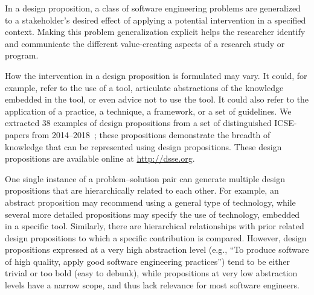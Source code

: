 \documentclass[graybox]{svmult}
\newcommand{\emelie}[1]{\textcolor{red}{{\it [Emelie says: #1]}}}
\newcommand{\peggy}[1]{\textcolor{blue}{{\it [Peggy says: #1]}}}
\newcommand{\per}[1]{\textcolor{cyan}{{\it [Per says: #1]}}}
\newcommand{\emelie}[1]{}
\newcommand{\peggy}[1]{}
\newcommand{\per}[1]{}
\begin{document}
In a design proposition, a class of software engineering problems are generalized to a stakeholder's desired effect of applying a potential intervention in a specified context. 
Making this problem generalization explicit helps the researcher identify and communicate the different value-creating aspects of a research study or program.

How the intervention in a design proposition is formulated may vary. It could, for example, refer to the use of a tool, articulate abstractions of the knowledge embedded in the tool, or even advice not to use the tool.
 It could also refer to the application of a practice, a technique, a framework, or a set of guidelines. We extracted 38 examples of design propositions from a set of distinguished ICSE-papers from 2014--2018~\cite{Engstrom19arxiv}; these propositions demonstrate the breadth of knowledge that can be represented using design propositions. These design propositions are available online at \url{http://dsse.org}.

One single instance of a problem--solution pair can generate multiple design propositions that are hierarchically related to each other. For example, an abstract proposition may recommend using a general type of technology, while several more detailed propositions may specify the use of technology, embedded in a specific tool. Similarly, there are hierarchical relationships with prior related design propositions to which a specific contribution is compared.
However, design propositions expressed at a very high abstraction level (e.g., ``To produce software of high quality, apply good software engineering practices'') tend to be either trivial or too bold (easy to debunk), while propositions at very low abstraction levels have a narrow scope, and thus lack relevance for most software engineers. 
\end{document}
